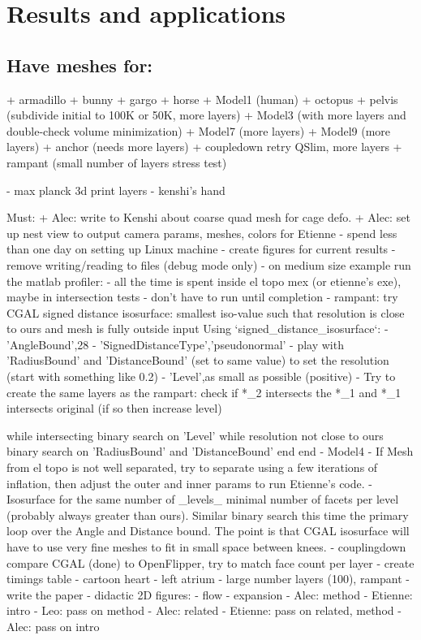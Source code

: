 
\section{Results and applications}
\label{sec:results}

\subsection{Have meshes for:}
  + armadillo
  + bunny
  + gargo
  + horse
  + Model1 (human)
  + octopus
  + pelvis (subdivide initial to 100K or 50K, more layers)
  + Model3 (with more layers and double-check volume minimization)
  + Model7 (more layers)
  + Model9 (more layers)
  + anchor (needs more layers)
  + coupledown retry QSlim, more layers
  + rampant (small number of layers stress test)

  - max planck 3d print layers
  - kenshi's hand

Must:
  + Alec: write to Kenshi about coarse quad mesh for cage defo.
  + Alec: set up nest view to output camera params, meshes, colors for Etienne
  - spend less than one day on setting up Linux machine
  - create figures for current results
  - remove writing/reading to files (debug mode only)
  - on medium size example run the matlab profiler:
    - all the time is spent inside el topo mex (or etienne's exe), maybe in
      intersection tests
    - don't have to run until completion
  - rampant: try CGAL signed distance isosurface: smallest iso-value such that
    resolution is close to ours and mesh is fully outside input
    Using `signed\_distance\_isosurface`:
    - 'AngleBound',28 
    - 'SignedDistanceType','pseudonormal'
    - play with 'RadiusBound' and 'DistanceBound' (set to same value) to set the
      resolution (start with something like 0.2)
    - 'Level',as small as possible (positive)
    - Try to create the same layers as the rampart: check if *\_2 intersects the
      *\_1 and *\_1 intersects original (if so then increase level)
  
    while intersecting
      binary search on 'Level'
      while resolution not close to ours
        binary search on 'RadiusBound' and 'DistanceBound'
      end
    end
  - Model4
    - If Mesh from el topo is not well separated, try to separate using a few
      iterations of inflation, then adjust the outer and inner params to run
      Etienne's code.
    - Isosurface for the same number of \_levels\_ minimal number of facets per
      level (probably always greater than ours). Similar binary search this
      time the primary loop over the Angle and Distance bound. The point is
      that CGAL isosurface will have to use very fine meshes to fit in small
      space between knees.
  - couplingdown compare CGAL (done) to OpenFlipper, try to match face count per
    layer
  - create timings table
  - cartoon heart 
  - left atrium
  - large number layers (100), rampant
  - write the paper
  - didactic 2D figures:
    - flow
    - expansion
  - Alec: method
  - Etienne: intro
  - Leo: pass on method
  - Alec: related
  - Etienne: pass on related, method
  - Alec: pass on intro

